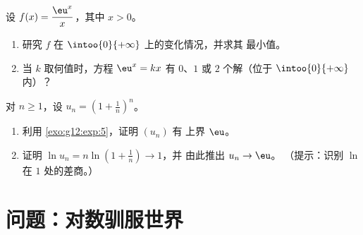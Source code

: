 \begin{exercise}[$\star\star\star$]\label{exo:g12:exp:8}
设 $f(x) = \dfrac{\eu^x}{x}$，其中 $x > 0$。
\begin{enumerate}
  \item 研究 $f$ 在 $\intoo{0}{+\infty}$ 上的变化情况，并求其
        最小值。
  \item 当 $k$ 取何值时，方程 $\eu^x = kx$ 有 $0$、$1$
        或 $2$ 个解（位于 $\intoo{0}{+\infty}$ 内）？
\end{enumerate}
\end{exercise}

\begin{exercise}[$\star\star\star$]\label{exo:g12:exp:9}
对 $n \geq 1$，设 $u_n = \left(1 + \frac1n\right)^n$。
\begin{enumerate}
  \item 利用 \cref{exo:g12:exp:5}，证明 $(u_n)$ 有
        上界 $\eu$。
  \item 证明 $\ln u_n = n \ln\left(1 + \frac1n\right) \to 1$，并
        由此推出 $u_n \to \eu$。
        （提示：识别 $\ln$ 在 $1$ 处的差商。）
\end{enumerate}
\end{exercise}

\section{问题：对数驯服世界}

